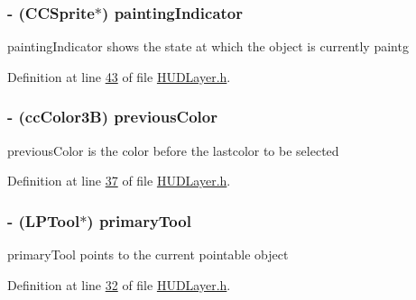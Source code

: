 \hypertarget{interface_h_u_d_layer_a67d356e56a82f871b6c5de5818c5985d}{
\subsubsection[{painting\-Indicator}]{\setlength{\rightskip}{0pt plus 5cm}-\/ (C\-C\-Sprite$\ast$) painting\-Indicator\hspace{0.3cm}{\ttfamily [protected]}}}\label{d3/d8a/interface_h_u_d_layer_a67d356e56a82f871b6c5de5818c5985d}
painting\-Indicator shows the state at which the object is currently paintg 

Definition at line \hyperlink{_h_u_d_layer_8h_source_l00043}{43} of file \hyperlink{_h_u_d_layer_8h_source}{H\-U\-D\-Layer.\-h}.

\hypertarget{interface_h_u_d_layer_a2b737d7aa3b728dd3d5990ef4cb68f29}{
\subsubsection[{previous\-Color}]{\setlength{\rightskip}{0pt plus 5cm}-\/ (cc\-Color3\-B) previous\-Color\hspace{0.3cm}{\ttfamily [protected]}}}\label{d3/d8a/interface_h_u_d_layer_a2b737d7aa3b728dd3d5990ef4cb68f29}
previous\-Color is the color before the lastcolor to be selected 

Definition at line \hyperlink{_h_u_d_layer_8h_source_l00037}{37} of file \hyperlink{_h_u_d_layer_8h_source}{H\-U\-D\-Layer.\-h}.

\hypertarget{interface_h_u_d_layer_aad9b0e2b4164986e18ea0a9afcd1a914}{
\subsubsection[{primary\-Tool}]{\setlength{\rightskip}{0pt plus 5cm}-\/ ({\bf L\-P\-Tool}$\ast$) primary\-Tool\hspace{0.3cm}{\ttfamily [protected]}}}\label{d3/d8a/interface_h_u_d_layer_aad9b0e2b4164986e18ea0a9afcd1a914}
primary\-Tool points to the current pointable object 

Definition at line \hyperlink{_h_u_d_layer_8h_source_l00032}{32} of file \hyperlink{_h_u_d_layer_8h_source}{H\-U\-D\-Layer.\-h}.

